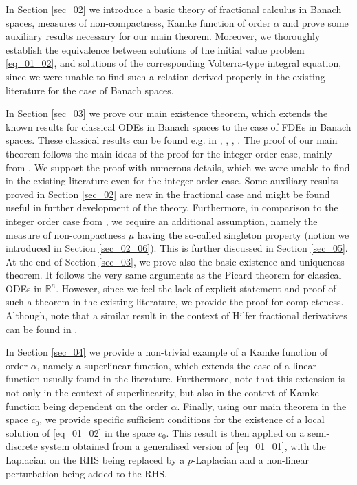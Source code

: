 \documentclass[reqno]{amsart}
\numberwithin{equation}{section}
\theoremstyle{definition}
\theoremstyle{remark}
\newcommand{\R}{\mathbb{R}}
\newcommand{\sectionRef}[1]{\textrm{Section \ref{#1}}}
\begin{document}
	In \sectionRef{sec_02} we introduce a basic theory of fractional calculus in Banach spaces, measures of non-compactness, Kamke function of order $\alpha$ and prove some auxiliary results necessary for our main theorem. Moreover, we thoroughly establish the equivalence between solutions of the initial value problem \eqref{eq_01_02}, and solutions of the corresponding Volterra-type integral equation, since we were unable to find such a relation derived properly in the existing literature for the case of Banach spaces.
	
	In \sectionRef{sec_03} we prove our main existence theorem, which extends the known results for classical ODEs in Banach spaces to the case of FDEs in Banach spaces. These classical results can be found e.g. in \cite{Ambrosetti}, \cite{Banas_book}, \cite{Li}, \cite{Monch}. The proof of our main theorem follows the main ideas of the proof for the integer order case, mainly from \cite{Banas_book}. We support the proof with numerous details, which we were unable to find in the existing literature even for the integer order case. Some auxiliary results proved in \sectionRef{sec_02} are new in the fractional case and might be found useful in further development of the theory. Furthermore, in comparison to the integer order case from \cite{Banas_book}, we require an additional assumption, namely the measure of non-compactness $\mu$ having the so-called singleton property (notion we introduced in \sectionRef{sec_02_06}). This is further discussed in \sectionRef{sec_05}. At the end of \sectionRef{sec_03}, we prove also the basic existence and uniqueness theorem. It follows the very same arguments as the Picard theorem for classical ODEs in $\R^n$. However, since we feel the lack of explicit statement and proof of such a theorem in the existing literature, we provide the proof for completeness. Although, note that a similar result in the context of Hilfer fractional derivatives can be found in \cite{Mei_Peng_Gao}.
	
	In \sectionRef{sec_04} we provide a non-trivial example of a Kamke function of order $\alpha$, namely a superlinear function, which extends the case of a linear function usually found in the literature. Furthermore, note that this extension is not only in the context of superlinearity, but also in the context of Kamke function being dependent on the order $\alpha$. Finally, using our main theorem in the space $c_0$, we provide specific sufficient conditions for the existence of a local solution of \eqref{eq_01_02} in the space $c_0$. This result is then applied on a semi-discrete system obtained from a generalised version of \eqref{eq_01_01}, with the Laplacian on the RHS being replaced by a $p$-Laplacian and a non-linear perturbation being added to the RHS.
	
\end{document}
